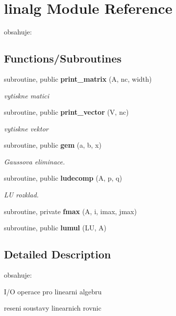 \section{linalg Module Reference}
\label{namespacelinalg}


obsahuje\+:  


\subsection*{Functions/\+Subroutines}
\begin{DoxyCompactItemize}
\item 
subroutine, public {\bf print\+\_\+matrix} (A, nc, width)
\begin{DoxyCompactList}\small\item\em vytiskne matici \end{DoxyCompactList}\item 
subroutine, public {\bf print\+\_\+vector} (V, nc)
\begin{DoxyCompactList}\small\item\em vytiskne vektor \end{DoxyCompactList}\item 
subroutine, public {\bf gem} (a, b, x)
\begin{DoxyCompactList}\small\item\em Gaussova eliminace. \end{DoxyCompactList}\item 
subroutine, public {\bf ludecomp} (A, p, q)
\begin{DoxyCompactList}\small\item\em LU rozklad. \end{DoxyCompactList}\item 
subroutine, private {\bf fmax} (A, i, imax, jmax)
\item 
subroutine, public {\bf lumul} (LU, A)
\end{DoxyCompactItemize}


\subsection{Detailed Description}
obsahuje\+: 


\begin{DoxyItemize}
\item I/O operace pro linearni algebru
\item reseni soustavy linearnich rovnic 
\end{DoxyItemize}

